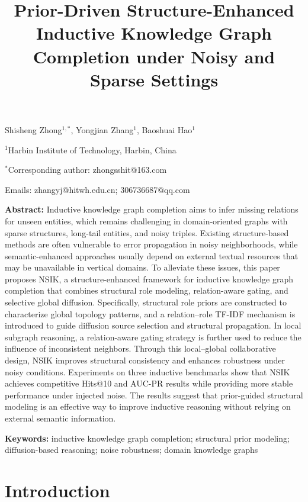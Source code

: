 \documentclass[preprint,12pt]{elsarticle}
\title{\textbf{Prior-Driven Structure-Enhanced Inductive Knowledge Graph Completion under Noisy and Sparse Settings}}
\author{}
\date{}
\begin{document}
\maketitle

\begin{center}
Shisheng Zhong$^{1,*}$, Yongjian Zhang$^{1}$, Baoshuai Hao$^{1}$

$^{1}$Harbin Institute of Technology, Harbin, China

$^{*}$Corresponding author: zhongsshit@163.com

Emails: zhangyj@hitwh.edu.cn; 306736687@qq.com
\end{center}

\vspace{1em}

 
\textbf{Abstract:} 
Inductive knowledge graph completion aims to infer missing relations for unseen entities, which remains challenging in domain-oriented graphs with sparse structures, long-tail entities, and noisy triples. Existing structure-based methods are often vulnerable to error propagation in noisy neighborhoods, while semantic-enhanced approaches usually depend on external textual resources that may be unavailable in vertical domains. 
To alleviate these issues, this paper proposes NSIK, a structure-enhanced framework for inductive knowledge graph completion that combines structural role modeling, relation-aware gating, and selective global diffusion. Specifically, structural role priors are constructed to characterize global topology patterns, and a relation--role TF-IDF mechanism is introduced to guide diffusion source selection and structural propagation. In local subgraph reasoning, a relation-aware gating strategy is further used to reduce the influence of inconsistent neighbors. Through this local--global collaborative design, NSIK improves structural consistency and enhances robustness under noisy conditions.
Experiments on three inductive benchmarks show that NSIK achieves competitive Hits@10 and AUC-PR results while providing more stable performance under injected noise. The results suggest that prior-guided structural modeling is an effective way to improve inductive reasoning without relying on external semantic information.

\textbf{Keywords:} inductive knowledge graph completion; structural prior modeling; diffusion-based reasoning; noise robustness; domain knowledge graphs

\section{Introduction}
\end{document}
